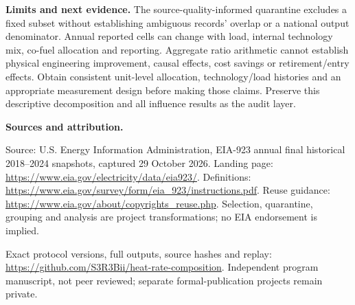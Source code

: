 \documentclass[11pt]{article}
\begin{document}
\textbf{Limits and next evidence.} The source-quality-informed quarantine excludes a fixed subset without establishing ambiguous records' overlap or a national output denominator. Annual reported cells can change with load, internal technology mix, co-fuel allocation and reporting. Aggregate ratio arithmetic cannot establish physical engineering improvement, causal effects, cost savings or retirement/entry effects. Obtain consistent unit-level allocation, technology/load histories and an appropriate measurement design before making those claims. Preserve this descriptive decomposition and all influence results as the audit layer.

\small\textbf{Sources and attribution.}\par
Source: U.S. Energy Information Administration, EIA-923 annual final historical 2018--2024 snapshots, captured 29 October 2026. Landing page: \url{https://www.eia.gov/electricity/data/eia923/}. Definitions: \url{https://www.eia.gov/survey/form/eia_923/instructions.pdf}. Reuse guidance: \url{https://www.eia.gov/about/copyrights_reuse.php}. Selection, quarantine, grouping and analysis are project transformations; no EIA endorsement is implied.\par
Exact protocol versions, full outputs, source hashes and replay: \url{https://github.com/S3R3Bii/heat-rate-composition}. Independent program manuscript, not peer reviewed; separate formal-publication projects remain private.
\end{document}
